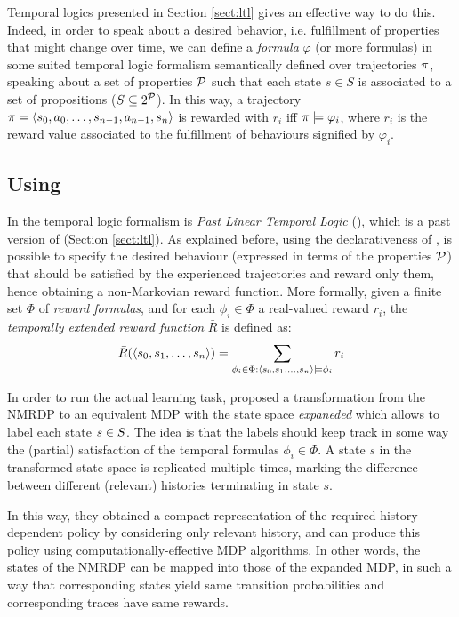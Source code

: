 Temporal logics presented in Section \ref{sect:ltl} gives an effective way to do this. 
Indeed, in order to speak about a desired behavior,  i.e. fulfillment of properties that might change over time, we can define a \emph{formula} $\varphi$ (or more formulas) in some suited temporal logic formalism semantically defined over trajectories $\pi$, speaking about a set of properties $\mathcal{P}$ such that each state $s\in S$ is associated to a set of propositions ($S\subseteq 2^{\mathcal{P}}$). 
In this way, a trajectory $\pi = \langle s_0, a_0, \dots, s_{n-1}, a_{n-1}, s_n \rangle$ is rewarded with $r_i$ iff $\pi \models \varphi_i$, where $r_i$ is the reward value associated to the fulfillment of behaviours signified by $\varphi_i$.

\subsection{Using \PLTL}
\label{sect:using-pltl}
In \citep{bacchus1996rewarding} the temporal logic formalism is \emph{Past Linear Temporal Logic} (\PLTL), which is a past version of \LTL (Section \ref{sect:ltl}).
As explained before, using the declarativeness of \PLTL, is possible to specify the desired behaviour (expressed in terms of the properties $\mathcal{P}$) that should be satisfied by the experienced trajectories and reward only them, hence obtaining a non-Markovian reward function. More formally, given a finite set $\Phi$ of \PLTL \emph{reward formulas}, and for each $\phi_i \in \Phi$ a real-valued reward $r_i$, the \emph{temporally extended reward function} $\bar{R}$ is defined as:
\begin{equation}\label{pltl-temp-extended-reward-fun}
\bar{R}(\langle s_0, s_1, \dots, s_n \rangle) = \sum_{\phi_i \in \Phi : \langle s_0, s_1, \dots, s_n \rangle\models \phi_i} r_i
\end{equation}


In order to run the actual learning task, \citep{bacchus1996rewarding} proposed a transformation from the NMRDP to an equivalent MDP with the state space \emph{expaneded} which allows to label each state $s\in S$. The idea is that the labels should keep track in some way the (partial) satisfaction of the temporal formulas $\phi_i \in \Phi$. 
A state $s$ in the transformed state space is replicated multiple times, marking the difference between different (relevant) histories terminating in state $s$.

In this way, they obtained a compact representation of the required history-dependent policy
by considering only relevant history, and can produce this
policy using computationally-effective MDP algorithms.
In other words, the states of the NMRDP can be mapped into those of the expanded MDP, 
in such a way that corresponding states yield
same transition probabilities and corresponding traces have same rewards.


